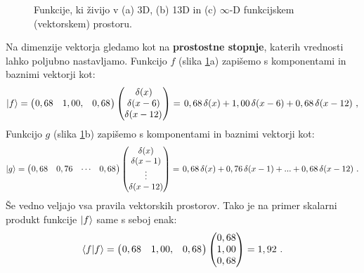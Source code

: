 \begin{figure}[ht]
\begin{subfigure}[b]{0.32\textwidth}
      \caption{}
  \end{subfigure}
    \caption{Funkcije, ki živijo v (a) 3D, (b) 13D in (c) $\infty$-D funkcijskem (vektorskem) prostoru.}
    \label{fig:discreteExample}
\end{figure}

Na dimenzije vektorja gledamo kot na \textbf{prostostne stopnje}, katerih vrednosti lahko poljubno nastavljamo. Funkcijo $f$ (slika \ref{fig:discreteExample}a) zapišemo s komponentami in baznimi vektorji kot:
\begin{equation}
   \ket{f} =
   \begin{pmatrix}
      \mkern1mu 0,68 & 1,00, & 0,68 \mkern1mu
   \end{pmatrix}
   \begin{pmatrix}
      \mkern1mu \delta(x) \\
      \delta(x-6) \\
      \delta(x-12) \mkern1mu
   \end{pmatrix}
   =
   \mkern2mu 0,68 \, \delta(x) + 1,00 \, \delta(x-6) + 0,68 \, \delta(x-12)
   \ ,
   \label{eq:discreteF}
\end{equation}
Funkcijo $g$ (slika \ref{fig:discreteExample}b) zapišemo s komponentami in baznimi vektorji kot:
\begin{equation}
   \ket{g} =
   \begin{pmatrix}
      \mkern1mu 0,68 & 0,76 & \cdots & 0,68 \mkern1mu
   \end{pmatrix}
   \begin{pmatrix}
      \delta(x) \\
      \delta(x-1) \\
      \vdots \\
      \delta(x-12)
   \end{pmatrix}
   =
   \mkern2mu 0,68 \, \delta(x) + 0,76 \, \delta(x-1) + ... + 0,68 \, \delta(x-12)
   \ .
   \label{eq:discreteG}
\end{equation}
Še vedno veljajo vsa pravila vektorskih prostorov. Tako je na primer skalarni produkt funkcije $\ket{f}$ same s seboj enak:
\begin{equation}
   \bra{f}\ket{f} =
   \begin{pmatrix}
      \mkern1mu 0,68 & 1,00, & 0,68 \mkern1mu
   \end{pmatrix}
   \begin{pmatrix}
      0,68 \\
      1,00 \\
      0,68
   \end{pmatrix}
   =
   1,92 \ .
\end{equation}
